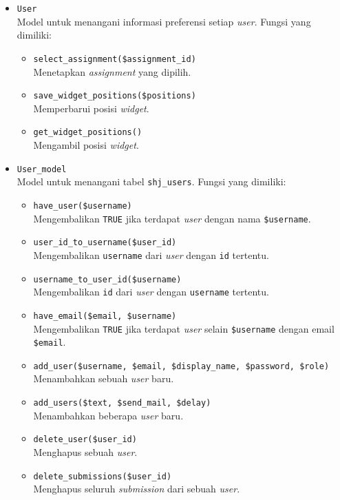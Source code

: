 \begin{itemize}
	\item \verb|User| \\ Model untuk menangani informasi preferensi setiap \textit{user}. Fungsi yang dimiliki:
	\begin{itemize}
	    \item \verb|select_assignment($assignment_id)| \\ Menetapkan \textit{assignment} yang dipilih.
	    \item \verb|save_widget_positions($positions)| \\ Memperbarui posisi \textit{widget}.
	    \item \verb|get_widget_positions()| \\ Mengambil posisi \textit{widget}.
	\end{itemize}
	
	\item \verb|User_model| \\ Model untuk menangani tabel \verb|shj_users|. Fungsi yang dimiliki:
	\begin{itemize}
	    \item \verb|have_user($username)| \\ Mengembalikan \verb|TRUE| jika terdapat \textit{user} dengan nama \verb|$username|.
	    \item \verb|user_id_to_username($user_id)| \\ Mengembalikan \verb|username| dari \textit{user} dengan \verb|id| tertentu.
	    \item \verb|username_to_user_id($username)| \\ Mengembalikan \verb|id| dari \textit{user} dengan \verb|username| tertentu.
	    \item \verb|have_email($email, $username)| \\ Mengembalikan \verb|TRUE| jika terdapat \textit{user} selain \verb|$username| dengan email \verb|$email|.
	    \item \verb|add_user($username, $email, $display_name, $password, $role)| \\ Menambahkan sebuah \textit{user} baru.
	    \item \verb|add_users($text, $send_mail, $delay)| \\ Menambahkan beberapa \textit{user} baru.
	    \item \verb|delete_user($user_id)| \\ Menghapus sebuah \textit{user}.
	    \item \verb|delete_submissions($user_id)| \\ Menghapus seluruh \textit{submission} dari sebuah \textit{user}.

\end{itemize}
\end{itemize}
